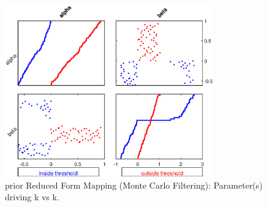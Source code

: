 
\begin{figure}[H]
\centering 
\includegraphics[width=0.8\textwidth]{RBC_kz/gsa/redform_prior/k_vs_k_threshold/RBC_kz_prior_k_vs_k_threshold}
\caption{prior Reduced Form Mapping (Monte Carlo Filtering): Parameter(s) driving k vs k.}\label{Fig:RBC_kz_prior_k_vs_k_threshold}
\end{figure}

